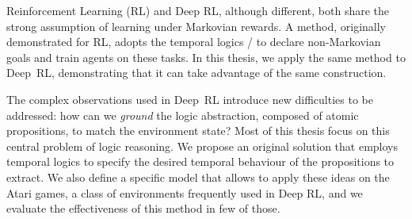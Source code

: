 Reinforcement Learning (RL) and Deep RL, although different, both share the
strong assumption of learning under Markovian rewards. A method, originally
demonstrated for RL, adopts the temporal logics \ltl{}/\ldl{} to declare
non-Markovian goals and train agents on these tasks. In this thesis, we
apply the same method to Deep~RL, demonstrating that it can take advantage of
the same construction.

The complex observations used in Deep~RL introduce new difficulties to be
addressed: how can we \emph{ground} the logic abstraction, composed of atomic
propositions, to match the environment state? Most of this thesis focus on
this central problem of logic reasoning. We propose an original solution that
employs temporal logics to specify the desired temporal behaviour of the
propositions to extract. We also define a specific model that allows to
apply these ideas on the Atari games, a class of environments frequently used
in Deep RL, and we evaluate the effectiveness of this method in few of those.
